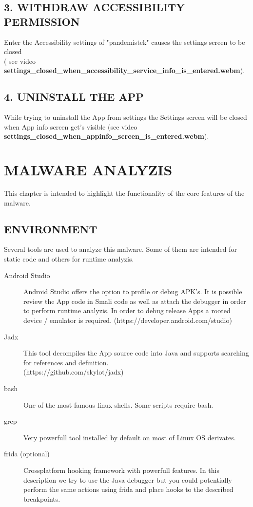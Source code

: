 \documentclass[10pt,titlepage]{article}
\begin{document}
\subsection{3. WITHDRAW ACCESSIBILITY PERMISSION}
Enter the Accessibility settings of "pandemistek" causes the settings screen to be closed 
\\  ( see video \textbf{settings\_closed\_when\_accessibility\_service\_info\_is\_entered.webm}).

\subsection{4. UNINSTALL THE APP}
While trying to uninstall the App from settings the Settings screen will be closed when App info screen get's visible (see video \textbf{settings\_closed\_when\_appinfo\_screen\_is\_entered.webm}).

\newpage
\section{MALWARE ANALYZIS}
This chapter is intended to highlight the functionality of the core features of the malware.

\subsection{ENVIRONMENT}
Several tools are used to analyze this malware. Some of them are intended for static code and others for runtime analyzis.

\begin{description}
\item[Android Studio] Android Studio offers the option to profile or debug APK's. It is possible review the App code in Smali code as well as attach the debugger in order to perform runtime analyzis. In order to debug release Apps a rooted device / emulator is required. (https://developer.android.com/studio)
\item[Jadx] This tool decompiles the App source code into Java and supports searching for references and definition. 
\\ (https://github.com/skylot/jadx)
\item[bash] One of the most famous linux shells. Some scripts require bash.
\item[grep] Very powerfull tool installed by default on most of Linux OS derivates.
\item[frida (optional)] Crossplatform hooking framework with powerfull features. In this description we try to use the Java debugger but you could potentially perform the same actions using frida and place hooks to the described breakpoints.
\end{description}
\end{document}
